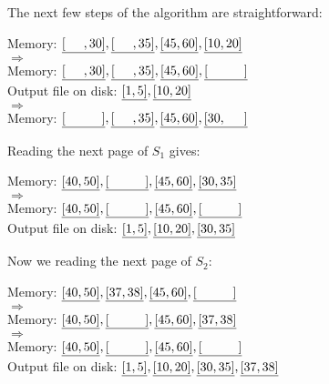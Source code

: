 \begin{sol}
\noindent The next few steps of the algorithm are straightforward:

\begin{center}
    Memory: $\uline{[\hspace{5mm}, 30]}, \uline{[\hspace{5mm}, 35]}, \uline{[45, 60]}, \uline{[10, 20]}$ \\
    $\Rightarrow$ \\
    Memory: $\uline{[\hspace{5mm}, 30]}, \uline{[\hspace{5mm}, 35]}, \uline{[45, 60]}, \uline{[\hspace{10mm}]}$ \\
    Output file on disk: $\uline{[1, 5]}, \uline{[10, 20]}$ \\
    $\Rightarrow$ \\
    Memory: $\uline{[\hspace{10mm}]}, \uline{[\hspace{5mm}, 35]}, \uline{[45, 60]}, \uline{[30, \hspace{5mm}]}$
\end{center}

\noindent Reading the next page of $S_1$ gives:

\begin{center}
    Memory: $\uline{[40, 50]}, \uline{[\hspace{10mm}]}, \uline{[45, 60]}, \uline{[30, 35]}$ \\
    $\Rightarrow$ \\
    Memory: $\uline{[40, 50]}, \uline{[\hspace{10mm}]}, \uline{[45, 60]}, \uline{[\hspace{10mm}]}$ \\
    Output file on disk: $\uline{[1, 5]}, \uline{[10, 20]}, \uline{[30, 35]}$ \\
\end{center}

\noindent Now we reading the next page of $S_2$:

\begin{center}
    Memory: $\uline{[40, 50]}, \uline{[37, 38]}, \uline{[45, 60]}, \uline{[\hspace{10mm}]}$ \\
    $\Rightarrow$ \\
    Memory: $\uline{[40, 50]}, \uline{[\hspace{10mm}]}, \uline{[45, 60]}, \uline{[37, 38]}$ \\
    $\Rightarrow$ \\
    Memory: $\uline{[40, 50]}, \uline{[\hspace{10mm}]}, \uline{[45, 60]}, \uline{[\hspace{10mm}]}$ \\
    Output file on disk: $\uline{[1, 5]}, \uline{[10, 20]}, \uline{[30, 35]}, \uline{[37, 38]}$ \\
\end{center}


\end{sol}

